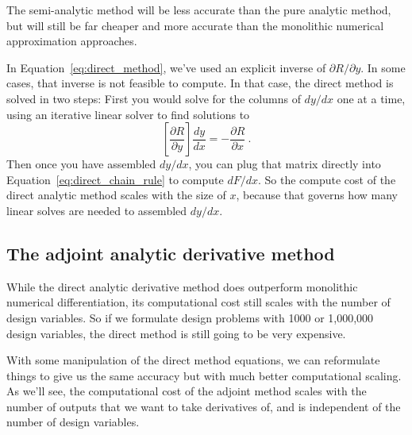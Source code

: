 \documentclass[conf]{new-aiaa}
\begin{document}
    The semi-analytic method will be less accurate than the pure analytic method, but will still be far cheaper and more accurate than the monolithic numerical approximation approaches. 

    In Equation~\ref{eq:direct_method}, we've used an explicit inverse of $\partial R/\partial y$. 
    In some cases, that inverse is not feasible to compute. In that case, the direct method is solved in two steps: 
    First you would solve for the columns of $dy/dx$ one at a time, using an iterative linear solver to find solutions to
    \begin{equation}
    \left[\frac{\partial R}{\partial y}\right] \frac{dy}{dx} = - \frac{\partial R}{\partial x} \ . 
    \end{equation}
    Then once you have assembled $dy/dx$, you can plug that matrix directly into Equation~\eqref{eq:direct_chain_rule} to compute $dF/dx$. 
    So the compute cost of the direct analytic method scales with the size of $x$, because that governs how many linear solves are needed to assembled $dy/dx$. 


    
    \subsection{The adjoint analytic derivative method}

    While the direct analytic derivative method does outperform monolithic numerical differentiation, its computational cost still scales with the number of design variables. 
    So if we formulate design problems with 1000 or 1,000,000 design variables, the direct method is still going to be very expensive. 

    With some manipulation of the direct method equations, we can reformulate things to give us the same accuracy but with much better computational scaling. 
    As we'll see, the computational cost of the adjoint method scales with the number of outputs that we want to take derivatives of, and is independent of the number of design variables. 
\end{document}
